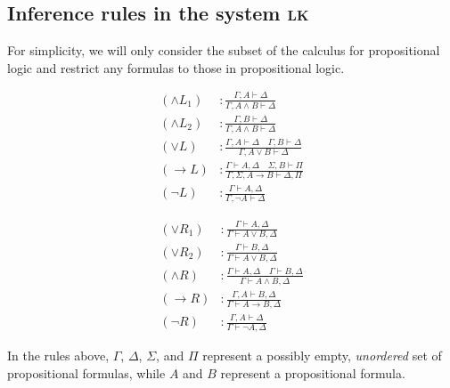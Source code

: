 \subsection{Inference rules in the system \textsc{lk}}
For simplicity, we will only consider the subset of the calculus for propositional logic and restrict any formulas to those in propositional logic.
\begin{center}
    \begin{minipage}{.4\textwidth}
        \begin{align*}
            (\land L_1) &: \frac{\Gamma, A \vdash \Delta}{\Gamma, A \land B \vdash \Delta} \\[1em]
            (\land L_2) &: \frac{\Gamma, B \vdash \Delta}{\Gamma, A \land B \vdash \Delta} \\[1em]
            (\lor L) &: \frac{\Gamma, A \vdash \Delta \quad \Gamma, B \vdash \Delta}{\Gamma, A \lor B \vdash \Delta} \\[1em]
            (\rightarrow L) &: \frac{\Gamma \vdash A, \Delta \quad \Sigma, B \vdash \Pi}{\Gamma, \Sigma, A \rightarrow B \vdash \Delta, \Pi} \\[1em]
            (\lnot L) &: \frac{\Gamma \vdash A, \Delta}{\Gamma, \lnot A \vdash \Delta}
        \end{align*}
    \end{minipage}%
    \begin{minipage}{.4\textwidth}
        \begin{align*}
            (\lor R_1) &: \frac{\Gamma \vdash A, \Delta}{\Gamma \vdash A \lor B, \Delta} \\[1em]
            (\lor R_2) &: \frac{\Gamma \vdash B, \Delta}{\Gamma \vdash A \lor B, \Delta} \\[1em]
            (\land R) &: \frac{\Gamma \vdash A, \Delta \quad \Gamma \vdash B, \Delta}{\Gamma \vdash A \land B, \Delta} \\[1em]
            (\rightarrow R) &: \frac{\Gamma, A \vdash B, \Delta}{\Gamma \vdash A \rightarrow B, \Delta} \\[1em]
            (\lnot R) &: \frac{\Gamma, A \vdash \Delta}{\Gamma \vdash \lnot A, \Delta}
        \end{align*}
    \end{minipage}
\end{center}
In the rules above, $\Gamma$, $\Delta$, $\Sigma$, and $\Pi$ represent a possibly empty, \textit{unordered} set of propositional formulas, while $A$ and $B$ represent a propositional formula.
